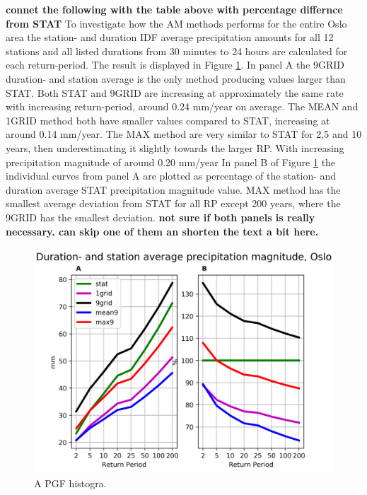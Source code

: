 \textbf{connet the following with the table above with percentage differnce from STAT} To investigate how the AM methods performs for the entire Oslo area the station- and duration IDF average precipitation amounts for all 12 stations and all listed durations from 30 minutes to 24 hours are calculated for each return-period. The result is displayed in Figure \ref{fig:table_dur_stat}. In panel A the 9GRID duration- and station average is the only method producing values larger than STAT. Both STAT and 9GRID are increasing at approximately the same rate with increasing return-period, around 0.24 mm/year on average. The MEAN and 1GRID method both have smaller values compared to STAT, increasing at around 0.14 mm/year. The MAX method are very similar to STAT for 2,5 and 10 years, then underestimating it slightly towards the larger RP. With increasing precipitation magnitude of around 0.20 mm/year In panel B of Figure \ref{fig:table_dur_stat} the individual curves from panel A are plotted as percentage of the station- and duration average STAT precipitation magnitude value. MAX method has the smallest average deviation from STAT for all RP except 200 years, where the 9GRID has the smallest deviation. \textbf{not sure if both panels is really necessary. can skip one of them an shorten the text a bit here.}      

\begin{figure}
    \begin{center}
        \includegraphics[scale=0.4]{figures/table_avg_dur_stat.png}
    \end{center}
    \caption{A PGF histogra.}
    \label{fig:table_dur_stat}
\end{figure}

